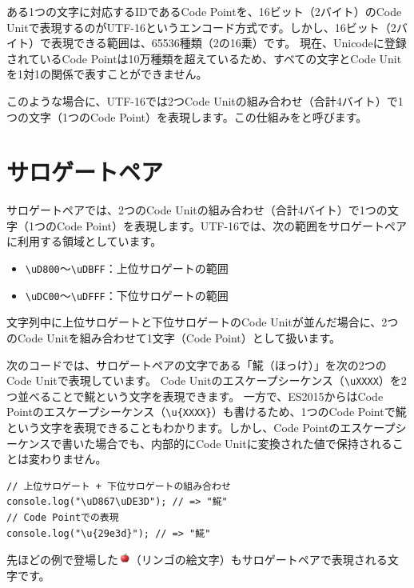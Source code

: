 ある1つの文字に対応するIDであるCode Pointを、16ビット（2バイト）のCode
Unitで表現するのがUTF-16というエンコード方式です。しかし、16ビット（2バイト）で表現できる範囲は、65536種類（2の16乗）です。
現在、Unicodeに登録されているCode
Pointは10万種類を超えているため、すべての文字とCode
Unitを1対1の関係で表すことができません。

このような場合に、UTF-16では2つCode
Unitの組み合わせ（合計4バイト）で1つの文字（1つのCode
Point）を表現します。この仕組みを\textbf{}と呼びます。

\hypertarget{surrogate-pair}{%
\section{サロゲートペア}\label{surrogate-pair}}

サロゲートペアでは、2つのCode
Unitの組み合わせ（合計4バイト）で1つの文字（1つのCode
Point）を表現します。UTF-16では、次の範囲をサロゲートペアに利用する領域としています。

\begin{itemize}
\item
  \texttt{\textbackslash uD800}～\texttt{\textbackslash uDBFF}：上位サロゲートの範囲
\item
  \texttt{\textbackslash uDC00}～\texttt{\textbackslash uDFFF}：下位サロゲートの範囲
\end{itemize}

文字列中に上位サロゲートと下位サロゲートのCode
Unitが並んだ場合に、2つのCode Unitを組み合わせて1文字（Code
Point）として扱います。

次のコードでは、サロゲートペアの文字である「𩸽（ほっけ）」を次の2つのCode
Unitで表現しています。 Code
Unitのエスケープシーケンス（\texttt{\textbackslash uXXXX}）を2つ並べることで𩸽という文字を表現できます。
一方で、ES2015からはCode
Pointのエスケープシーケンス（\texttt{\textbackslash u\{XXXX\}}）も書けるため、1つのCode
Pointで𩸽という文字を表現できることもわかります。しかし、Code
Pointのエスケープシーケンスで書いた場合でも、内部的にCode
Unitに変換された値で保持されることは変わりません。

\begin{lstlisting}
// 上位サロゲート + 下位サロゲートの組み合わせ
console.log("\uD867\uDE3D"); // => "𩸽"
// Code Pointでの表現
console.log("\u{29e3d}"); // => "𩸽"
\end{lstlisting}

先ほどの例で登場した\includegraphics[clip,height=4mm]{fig/apple.eps}（リンゴの絵文字）もサロゲートペアで表現される文字です。

